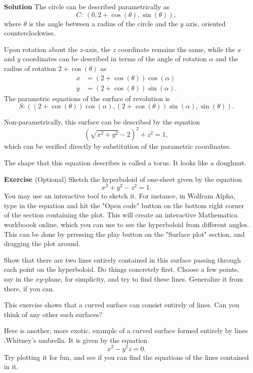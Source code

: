 \documentclass[12pt,oneside]{exam}
\newenvironment{exercise}[1]{\vspace{.1in}\noindent\textbf{Exercise #1 \hspace{.05em}}}{}
\newenvironment{newsolution}{\vspace{.1in}\noindent\textbf{Solution \hspace{.05em}}}{}
\begin{document}
\begin{newsolution}
The circle can be described parametrically as 
\begin{equation*}
C \colon \ (0,2+\cos(\theta), \sin(\theta)),
\end{equation*}
where $\theta$ is the angle between a radius of the circle and the $y$ axis, oriented counterclockwise. 

Upon rotation about the $z$-axis, the $z$ coordinate remains the same, while the $x$ and $y$ coordinates can be described in terms of the angle of rotation $\alpha$ and the radius of rotation $2+\cos(\theta)$ as 
\begin{align*}
x & = (2+\cos(\theta))\cos(\alpha)\\
y & = (2+\cos(\theta))\sin(\alpha).
\end{align*}
The parametric equations of the surface of revolution is 
\begin{equation*}
S \colon ((2+\cos(\theta))\cos(\alpha),(2+\cos(\theta))\sin(\alpha), \sin(\theta)). 
\end{equation*}

Non-parametrically, this surface can be described by the equation
\begin{equation*}
(\sqrt{x^2+y^2}-2)^2 + z^2 = 1, 
\end{equation*}
which can be verified directly by substitution of the parametric coordinates. 

The shape that this equation describes is called a torus. It looks like a doughnut. 
\end{newsolution}

\begin{exercise}{11}\textbf{(Optional)}
Sketch the hyperboloid of one-sheet given by the equation
\begin{equation*}
x^2+y^2-z^2=1.
\end{equation*}
You may use an interactive tool to sketch it. For instance, in Wolfram Alpha, type in the equation and hit the "Open code" button on the bottom right corner of the section containing the plot. This will create an interactive Mathematica workboook online, which you can use to see the hyperboloid from different angles. This can be done by prressing the play button on the "Surface plot" section, and dragging the plot around. 

Show that there are two lines entirely contained in this surface passing through each point on the hyperboloid. Do things concretely first. Choose a few points, say in the $xy$-plane, for simplicity, and try to find these lines. Generalize it from there, if you can. 

This exercise shows that a curved surface can consist entirely of lines. Can you think of any other such surfaces? 

Here is another, more exotic, example of a curved surface formed entirely by lines :Whitney's umbrella. It is given by the equation 
\begin{equation*}
x^2-y^2z=0.
\end{equation*}
Try plotting it for fun, and see if you can find the equations of the lines contained in it.
\end{exercise}
\end{document}
